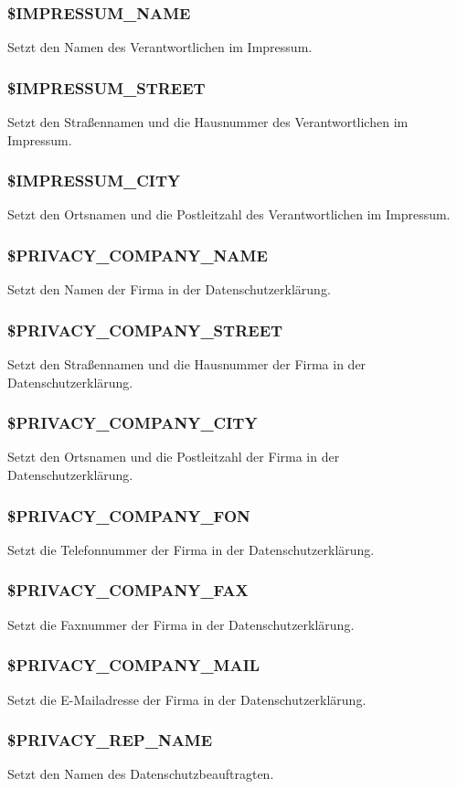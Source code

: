 \subsubsection{\$IMPRESSUM\_NAME} Setzt den Namen des Verantwortlichen im Impressum.
\subsubsection{\$IMPRESSUM\_STREET} Setzt den Straßennamen und die Hausnummer des Verantwortlichen im Impressum.
\subsubsection{\$IMPRESSUM\_CITY} Setzt den Ortsnamen und die Postleitzahl des Verantwortlichen im Impressum.
\subsubsection{\$PRIVACY\_COMPANY\_NAME} Setzt den Namen der Firma in der Datenschutzerklärung.
\subsubsection{\$PRIVACY\_COMPANY\_STREET} Setzt den Straßennamen und die Hausnummer der Firma in der Datenschutzerklärung.
\subsubsection{\$PRIVACY\_COMPANY\_CITY} Setzt den Ortsnamen und die Postleitzahl der Firma in der Datenschutzerklärung.
\subsubsection{\$PRIVACY\_COMPANY\_FON} Setzt die Telefonnummer der Firma in der Datenschutzerklärung.
\subsubsection{\$PRIVACY\_COMPANY\_FAX} Setzt die Faxnummer der Firma in der Datenschutzerklärung.
\subsubsection{\$PRIVACY\_COMPANY\_MAIL} Setzt die E-Mailadresse der Firma in der Datenschutzerklärung.
\subsubsection{\$PRIVACY\_REP\_NAME} Setzt den Namen des Datenschutzbeauftragten.
